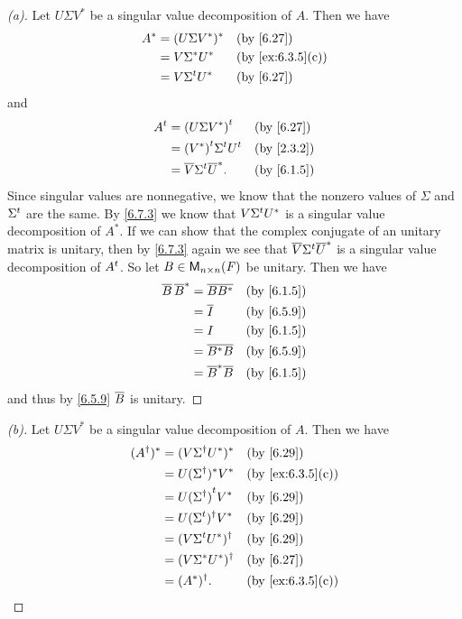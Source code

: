 \begin{proof}[(a)]
  Let \(U \Sigma V^*\) be a singular value decomposition of \(A\).
  Then we have
  \begin{align*}
    A^* & = (U \Sigma V^*)^*  &  & \by{6.27}        \\
        & = V \Sigma^* U^*    &  & \by{ex:6.3.5}[c] \\
        & = V \tp{\Sigma} U^* &  & \by{6.27}
  \end{align*}
  and
  \begin{align*}
    \tp{A} & = \tp{(U \Sigma V^*)}              &  & \by{6.27}  \\
           & = \tp{(V^*)} \tp{\Sigma} \tp{U}    &  & \by{2.3.2} \\
           & = \conj{V} \tp{\Sigma} \conj{U}^*. &  & \by{6.1.5}
  \end{align*}
  Since singular values are nonnegative, we know that the nonzero values of \(\Sigma\) and \({\Sigma}^{t}\) are the same.
  By \cref{6.7.3} we know that \(V {\Sigma}^{t} U^*\) is a singular value decomposition of \(A^*\).
  If we can show that the complex conjugate of an unitary matrix is unitary, then by \cref{6.7.3} again we see that \(\overline{V} {\Sigma}^{t} \overline{U}^*\) is a singular value decomposition of \({A}^{t}\).
  So let \(B \in \ms[n][n][\F]\) be unitary.
  Then we have
  \begin{align*}
    \conj{B} \, \conj{B}^* & = \conj{B B^*}        &  & \by{6.1.5} \\
                           & = \conj{I}            &  & \by{6.5.9} \\
                           & = I                   &  & \by{6.1.5} \\
                           & = \conj{B^* B}        &  & \by{6.5.9} \\
                           & = \conj{B}^* \conj{B} &  & \by{6.1.5}
  \end{align*}
  and thus by \cref{6.5.9} \(\overline{B}\) is unitary.
\end{proof}

\begin{proof}[(b)]
  Let \(U \Sigma V^*\) be a singular value decomposition of \(A\).
  Then we have
  \begin{align*}
    (A^{\dag})^* & = (V \Sigma^{\dag} U^*)^*    &  & \by{6.29}        \\
                 & = U (\Sigma^{\dag})^* V^*    &  & \by{ex:6.3.5}[c] \\
                 & = U \tp{(\Sigma^{\dag})} V^* &  & \by{6.29}        \\
                 & = U (\tp{\Sigma})^{\dag} V^* &  & \by{6.29}        \\
                 & = (V \tp{\Sigma} U^*)^{\dag} &  & \by{6.29}        \\
                 & = (V \Sigma^* U^*)^{\dag}    &  & \by{6.27}        \\
                 & = (A^*)^{\dag}.              &  & \by{ex:6.3.5}[c]
  \end{align*}
\end{proof}

